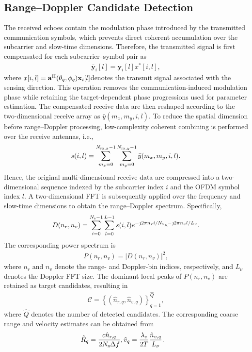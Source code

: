 \documentclass[conference]{IEEEtran}
\begin{document}
\subsection{Range--Doppler Candidate Detection} The received echoes contain the modulation phase introduced by the transmitted communication symbols, which prevents direct coherent accumulation over the subcarrier and slow-time dimensions. Therefore, the transmitted signal is first compensated for each subcarrier--symbol pair as 
\begin{align} 
\bar{\mathbf{y}}_i[l] = \mathbf{y}_i[l]x^{*}[i,l], \label{eq:tx_compensation} 
\end{align} 
where $x[i,l] = \mathbf{a}^{\rm H}(\theta_q,\phi_q)\mathbf{x}_i[l]$denotes the transmit signal associated with the sensing direction. This operation removes the communication-induced modulation phase while retaining the target-dependent phase progressions used for parameter estimation. The compensated receive data are then reshaped according to the two-dimensional receive array as $\bar{y}(m_x,m_y,i,l)$. To reduce the spatial dimension before range--Doppler processing, low-complexity coherent combining is performed over the receive antennas, i.e., 
\begin{align} 
s(i,l) = \sum_{m_x=0}^{N_{{\rm rx},x}-1} \sum_{m_y=0}^{N_{{\rm rx},y}-1} \bar{y}(m_x,m_y,i,l). \label{eq:spatial_combining} 
\end{align} 
Hence, the original multi-dimensional receive data are compressed into a two-dimensional sequence indexed by the subcarrier index $i$ and the OFDM symbol index $l$. A two-dimensional FFT is subsequently applied over the frequency and slow-time dimensions to obtain the range--Doppler spectrum. Specifically, 
\begin{align} 
D(n_r,n_v) = \sum_{i=0}^{N_{\rm s}-1} \sum_{l=0}^{L-1} s(i,l) e^{-\jmath 2\pi n_r i/N_{\rm s}} e^{-\jmath 2\pi n_v l/L_{\nu}}. \label{eq:rd_fft} 
\end{align} 
The corresponding power spectrum is 
\begin{align} 
P(n_r,n_v) = \left|D(n_r,n_v)\right|^2, \label{eq:rd_power} 
\end{align} 
where $n_r$ and $n_v$ denote the range- and Doppler-bin indices, respectively, and $L_{\nu}$ denotes the Doppler FFT size. The dominant local peaks of $P(n_r,n_v)$ are retained as target candidates, resulting in 
\begin{align} 
\mathcal{C} = \left\{ (\hat n_{r,q},\hat n_{v,q}) \right\}_{q=1}^{\hat Q}, \label{eq:candidate_set} 
\end{align} 
where $\hat Q$ denotes the number of detected candidates. The corresponding coarse range and velocity estimates can be obtained from 
\begin{align} \hat R_q &= \frac{c\hat n_{r,q}} {2N_{\rm s}\Delta f},  \hat v_q = \frac{\lambda_c}{2T} \frac{\hat n_{v,q}}{L_{\nu}}. \label{eq:velocity_est} 
\end{align} 
\end{document}
